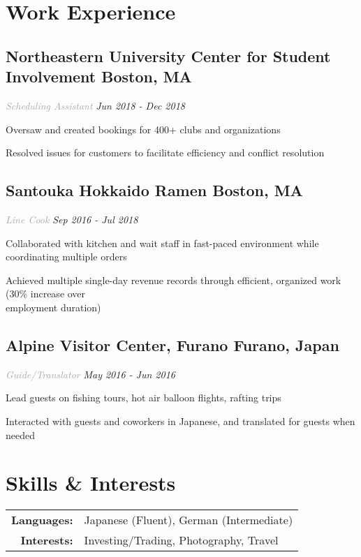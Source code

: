 \documentclass{article}
\begin{document}
\section[Work Experience \hfill]{Work Experience \sout{\hfill}}
    \subsection{{\bfseries\large Northeastern University Center for Student Involvement} \hfill Boston, MA}
    \textit{\textcolor{darkgray}{Scheduling Assistant}} \hfill \textit{Jun 2018 - Dec 2018}
    \begin{myitemize}
        \item Oversaw and created bookings for 400+ clubs and organizations
        \item Resolved issues for customers to facilitate efficiency and conflict resolution
    \end{myitemize}
    \subsection{{\bfseries\large Santouka Hokkaido Ramen} \hfill Boston, MA}
    \textit{\textcolor{darkgray}{Line Cook}} \hfill \textit{Sep 2016 - Jul 2018}
    \begin{myitemize}
        \item Collaborated with kitchen and wait staff in fast-paced environment while coordinating multiple orders
        \item Achieved multiple single-day revenue records through efficient, organized work (30\% increase over\\
        employment duration)
    \end{myitemize}
    \subsection{{\bfseries\large Alpine Visitor Center, Furano} \hfill Furano, Japan}
    \textit{\textcolor{darkgray}{Guide/Translator}} \hfill \textit{May 2016 - Jun 2016}
    \begin{myitemize}
        \item Lead guests on fishing tours, hot air balloon flights, rafting trips
        \item Interacted with guests and coworkers in Japanese, and translated for guests when needed
    \end{myitemize}
    
\section[Skills \& Interests \hfill]{Skills \& Interests \sout{\hfill}}
    \begin{tabular}{rl}
        {\bfseries Languages: }&Japanese (Fluent), German (Intermediate)\\
        {\bfseries Interests: }&Investing/Trading, Photography, Travel
    \end{tabular}
\end{document}
